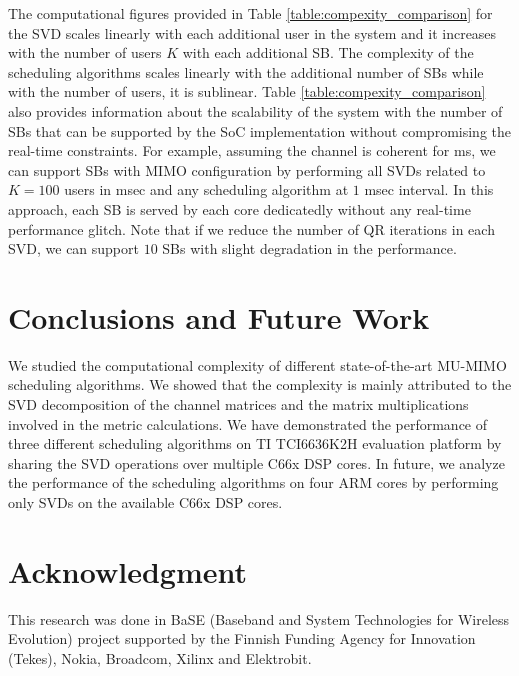 \documentclass[conference,letterpaper]{./../../IEEE/IEEEtran}
\begin{document}
The computational figures provided in Table \ref{table:compexity_comparison} for the SVD scales linearly with each additional user in the system and it increases with the number of users $K$ with each additional SB. The complexity of the scheduling algorithms scales linearly with the additional number of SBs while with the number of users, it is sublinear. Table \ref{table:compexity_comparison} also provides information about the scalability of the system with the number of SBs that can be supported by the \ac{SoC} implementation without compromising the real-time constraints. For example, assuming the channel is coherent for  ms, we can support  SBs with  MIMO configuration by performing all SVDs related to $K = 100$ users in  msec and any scheduling algorithm at $1$ msec interval. In this approach, each SB is served by each core dedicatedly without any real-time performance glitch. Note that if we reduce the number of QR iterations in each SVD, we can support $10$ SBs with slight degradation in the performance.

\acresetall {}
\section{Conclusions and Future Work}
\label{sec:conclusion}
We studied the computational complexity of different state-of-the-art MU-MIMO scheduling algorithms. We showed that the complexity is mainly attributed to the SVD decomposition of the channel matrices and the matrix multiplications involved in the metric calculations. We have demonstrated the performance of three different scheduling algorithms on TI TCI6636K2H evaluation platform by sharing the SVD operations over multiple C66x DSP cores. In future, we analyze the performance of the scheduling algorithms on four ARM cores by performing only SVDs on the available C66x DSP cores.

\section*{Acknowledgment}
This research was done in BaSE (Baseband and System Technologies for Wireless Evolution) project supported by the Finnish Funding Agency for Innovation (Tekes), Nokia, Broadcom, Xilinx and Elektrobit.



%
\end{document}
